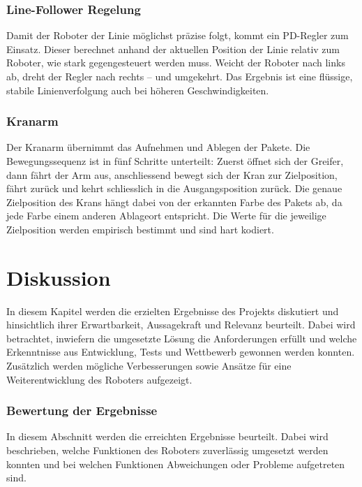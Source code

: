 \documentclass[11pt,a4paper]{article}
\begin{document}
	
	\subsubsection{Line-Follower Regelung}
	
	Damit der Roboter der Linie möglichst präzise folgt, kommt ein PD-Regler zum 
	Einsatz. Dieser berechnet anhand der aktuellen Position der Linie relativ zum Roboter, 
	wie stark gegengesteuert werden muss. Weicht der Roboter nach links ab, dreht der 
	Regler nach rechts -- und umgekehrt. Das Ergebnis ist eine flüssige, stabile 
	Linienverfolgung auch bei höheren Geschwindigkeiten.
	
	
	\subsubsection{Kranarm}
	
	Der Kranarm übernimmt das Aufnehmen und Ablegen der Pakete. Die Bewegungssequenz 
	ist in fünf Schritte unterteilt: Zuerst öffnet sich der Greifer, dann fährt der 
	Arm aus, anschliessend bewegt sich der Kran zur Zielposition, fährt zurück und 
	kehrt schliesslich in die Ausgangsposition zurück. Die genaue Zielposition des 
	Krans hängt dabei von der erkannten Farbe des Pakets ab, da jede Farbe einem 
	anderen Ablageort entspricht. Die Werte für die jeweilige Zielposition werden empirisch bestimmt und sind hart kodiert.
	
\newpage
	\section{Diskussion}
		In diesem Kapitel werden die erzielten Ergebnisse des Projekts diskutiert und hinsichtlich ihrer Erwartbarkeit, Aussagekraft und Relevanz beurteilt. Dabei wird betrachtet, inwiefern die umgesetzte Lösung die Anforderungen erfüllt und welche Erkenntnisse aus Entwicklung, Tests und Wettbewerb gewonnen werden konnten. Zusätzlich werden mögliche Verbesserungen sowie Ansätze für eine Weiterentwicklung des Roboters aufgezeigt.
	
	\subsubsection{Bewertung der Ergebnisse}
	
	In diesem Abschnitt werden die erreichten Ergebnisse beurteilt. Dabei wird beschrieben, welche Funktionen des Roboters zuverlässig umgesetzt werden konnten und bei welchen Funktionen Abweichungen oder Probleme aufgetreten sind.
	
\end{document}
